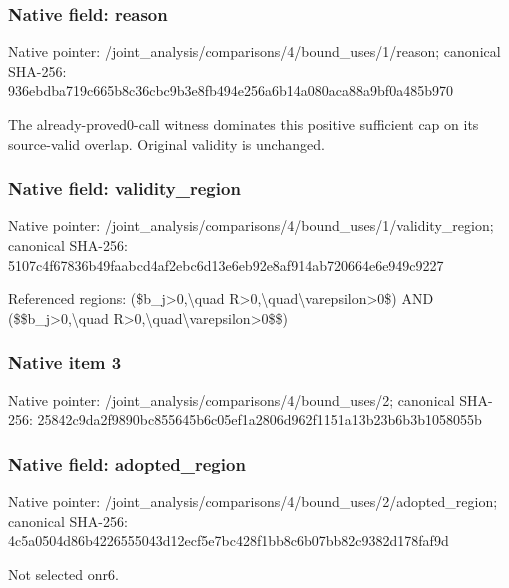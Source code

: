 \documentclass[10pt,a4paper]{article}
\begin{document}
\subsubsection{Native field: reason}
Native pointer: /joint\_\allowbreak{}analysis/comparisons/4/bound\_\allowbreak{}uses/1/reason; canonical SHA-256: 936ebdba719c665b8c36cbc9b3e8fb494e256a6b14a080aca88a9bf0a485b970

\begingroup\raggedright\sloppy The already-proved0-call witness dominates this positive sufficient cap on its source-valid overlap. Original validity is unchanged.\par\endgroup

\subsubsection{Native field: validity\_\allowbreak{}region}
Native pointer: /joint\_\allowbreak{}analysis/comparisons/4/bound\_\allowbreak{}uses/1/validity\_\allowbreak{}region; canonical SHA-256: 5107c4f67836b49faabcd4af2ebc6d13e6eb92e8af914ab720664e6e949c9227

\begingroup\raggedright\sloppy Referenced regions:\allowbreak{} (\$b\_\allowbreak{}j>0,\allowbreak{}\textbackslash{}quad R>0,\allowbreak{}\textbackslash{}quad\textbackslash{}varepsilon>0\$) AND (\$\$b\_\allowbreak{}j>0,\allowbreak{}\textbackslash{}quad R>0,\allowbreak{}\textbackslash{}quad\textbackslash{}varepsilon>0\$\$)\par\endgroup

\subsubsection{Native item 3}
Native pointer: /joint\_\allowbreak{}analysis/comparisons/4/bound\_\allowbreak{}uses/2; canonical SHA-256: 25842c9da2f9890bc855645b6c05ef1a2806d962f1151a13b23b6b3b1058055b

\subsubsection{Native field: adopted\_\allowbreak{}region}
Native pointer: /joint\_\allowbreak{}analysis/comparisons/4/bound\_\allowbreak{}uses/2/adopted\_\allowbreak{}region; canonical SHA-256: 4c5a0504d86b4226555043d12ecf5e7bc428f1bb8c6b07bb82c9382d178faf9d

\begingroup\raggedright\sloppy Not selected onr6.\par\endgroup
\end{document}
